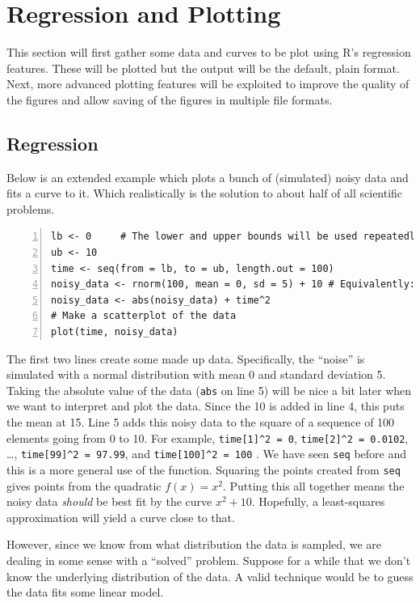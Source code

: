 \documentclass[12pt]{article}
\begin{document}
\section{Regression and Plotting}

This section will first gather some data and curves to be plot using R's regression features. These will be plotted but the output will be the default, plain format. Next, more advanced plotting features will be exploited to improve the quality of the figures and allow saving of the figures in multiple file formats.

\subsection{Regression}
Below is an extended example which plots a bunch of (simulated) noisy data and fits a curve to it. Which realistically is the solution to about half of all scientific problems.

\begin{Verbatim}[frame=single, fontsize=\small, numbers=left]
lb <- 0     # The lower and upper bounds will be used repeatedly
ub <- 10
time <- seq(from = lb, to = ub, length.out = 100)
noisy_data <- rnorm(100, mean = 0, sd = 5) + 10 # Equivalently: rnorm(100,10,5)
noisy_data <- abs(noisy_data) + time^2
# Make a scatterplot of the data
plot(time, noisy_data)
\end{Verbatim}

The first two lines create some made up data. Specifically, the ``noise'' is simulated with a normal distribution with mean 0 and standard deviation 5. Taking the absolute value of the data (\verb|abs| on line 5) will be nice a bit later when we want to interpret and plot the data. Since the 10 is added in line 4, this puts the mean at 15. Line 5 adds this noisy data to the square of a sequence of 100 elements going from 0 to 10. For example, \verb|time[1]^2 = 0|, \verb|time[2]^2 = 0.0102|, \dots, \verb|time[99]^2 = 97.99|, and \verb|time[100]^2 = 100| . We have seen \verb|seq| before and this is a more general use of the function. Squaring the points created from \verb|seq| gives points from the quadratic $f(x) = x^2$. Putting this all together means the noisy data \emph{should} be best fit by the curve $x^2 + 10$. Hopefully, a least-squares approximation will yield a curve close to that.

However, since we know from what distribution the data is sampled, we are dealing in some sense with a ``solved'' problem. Suppose for a while that we don't know the underlying distribution of the data. A valid technique would be to guess the data fits some linear model.
\end{document}

